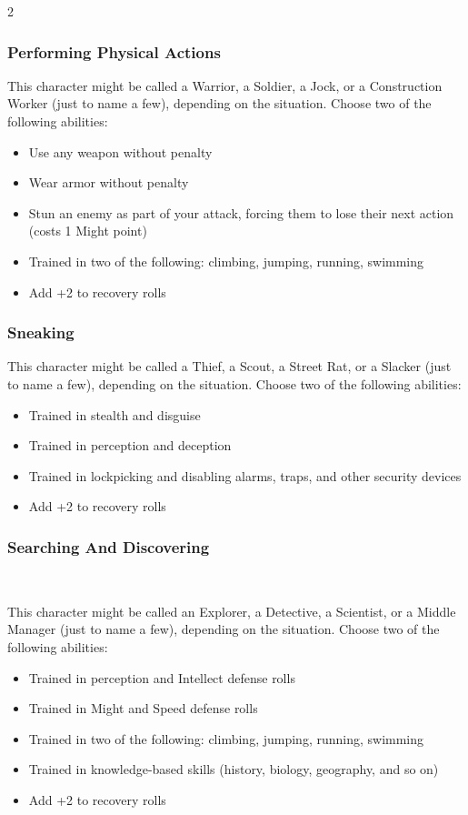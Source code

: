 \begin{multicols}{2}
\subsubsection{Performing Physical Actions}

This character might be called a Warrior, a Soldier, a Jock, or a Construction Worker (just to name a few), depending on the situation. Choose two of the following abilities:

\begin{itemize}
\item Use any weapon without penalty
\item Wear armor without penalty
\item Stun an enemy as part of your attack, forcing them to lose their next action (costs 1 Might point)
\item Trained in two of the following: climbing, jumping, running, swimming \item Add +2 to recovery rolls
\end{itemize}

\subsubsection{Sneaking}

This character might be called a Thief, a Scout, a Street Rat, or a Slacker (just to name a few), depending on the situation. Choose two of the following abilities:

\begin{itemize}
\item Trained in stealth and disguise
\item Trained in perception and deception
\item Trained in lockpicking and disabling alarms, traps, and other security devices
\item Add +2 to recovery rolls
\end{itemize}

\subsubsection{Searching And Discovering} 

This character might be called an Explorer, a Detective, a Scientist, or a Middle Manager (just to name a few), depending on the situation. Choose two of the following abilities:

\begin{itemize}
\item Trained in perception and Intellect defense rolls
\item Trained in Might and Speed defense rolls 
\item Trained in two of the following: climbing, jumping, running, swimming
\item Trained in knowledge-based skills (history, biology, geography, and so on) \item Add +2 to recovery rolls
\end{itemize}


\end{multicols}
